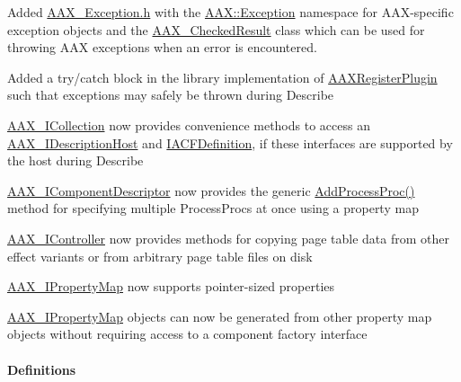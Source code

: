 \begin{DoxyItemize}
\item Added \mbox{\hyperlink{a00497}{A\+A\+X\+\_\+\+Exception.\+h}} with the \mbox{\hyperlink{a00853}{A\+A\+X\+::\+Exception}} namespace for A\+AX-\/specific exception objects and the \mbox{\hyperlink{a01601}{A\+A\+X\+\_\+\+Checked\+Result}} class which can be used for throwing A\+AX exceptions when an error is encountered.  
\item Added a try/catch block in the library implementation of \mbox{\hyperlink{a00796_ga83d05333118598c179ca6d89487fa203}{A\+A\+X\+Register\+Plugin}} such that exceptions may safely be thrown during Describe  
\item \mbox{\hyperlink{a01777}{A\+A\+X\+\_\+\+I\+Collection}} now provides convenience methods to access an \mbox{\hyperlink{a01793}{A\+A\+X\+\_\+\+I\+Description\+Host}} and \mbox{\hyperlink{a01413}{I\+A\+C\+F\+Definition}}, if these interfaces are supported by the host during Describe  
\item \mbox{\hyperlink{a01781}{A\+A\+X\+\_\+\+I\+Component\+Descriptor}} now provides the generic \mbox{\hyperlink{a01781_a0e8f6217d0f317c728b3e30f15f181d2}{Add\+Process\+Proc()}} method for specifying multiple Process\+Procs at once using a property map  
\item \mbox{\hyperlink{a01789}{A\+A\+X\+\_\+\+I\+Controller}} now provides methods for copying page table data from other effect variants or from arbitrary page table files on disk  
\item \mbox{\hyperlink{a01869}{A\+A\+X\+\_\+\+I\+Property\+Map}} now supports pointer-\/sized properties  
\item \mbox{\hyperlink{a01869}{A\+A\+X\+\_\+\+I\+Property\+Map}} objects can now be generated from other property map objects without requiring access to a component factory interface  
\end{DoxyItemize}\hypertarget{a00847_aax_sdk_2p3p0_Definitions}{}\paragraph{Definitions}\label{a00847_aax_sdk_2p3p0_Definitions}

